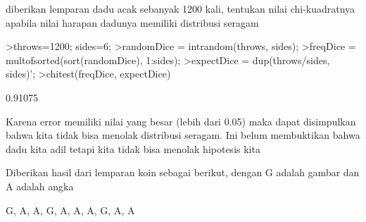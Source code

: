\documentclass[a4paper,10pt]{article}
\begin{document}
\begin{eulernotebook}
\begin{eulercomment}
\begin{eulercomment}
\begin{eulercomment}
\begin{eulercomment}
\begin{eulercomment}
\begin{eulercomment}
\begin{euleroutput}
  [0.34485,  0.080751,  0.87652,  0.75416,  0.68839]
\end{euleroutput}
\begin{eulercomment}
\end{eulercomment}
\begin{eulercomment}
diberikan lemparan dadu acak sebanyak 1200 kali, tentukan nilai
chi-kuadratnya apabila nilai harapan dadunya memiliki distribusi
seragam
\end{eulercomment}
\begin{eulerprompt}
>throws=1200; sides=6;
>randomDice = intrandom(throws, sides);
>freqDice = multofsorted(sort(randomDice), 1:sides);
>expectDice = dup(throws/sides, sides)';
>chitest(freqDice, expectDice)
\end{eulerprompt}
\begin{euleroutput}
  0.91075
\end{euleroutput}
\begin{eulercomment}
Karena error memiliki nilai yang besar (lebih dari 0.05) maka dapat
disimpulkan bahwa kita tidak bisa menolak distribusi seragam. Ini
belum membuktikan bahwa dadu kita adil tetapi kita tidak bisa menolak
hipotesis kita
\end{eulercomment}
\begin{eulercomment}
Diberikan hasil dari lemparan koin sebagai berikut, dengan G adalah
gambar dan A adalah angka

G, A, A, G, A, A, A, G, A, A


\end{eulercomment}
\end{eulercomment}
\end{eulercomment}
\end{eulercomment}
\end{eulercomment}
\end{eulercomment}
\end{eulercomment}
\end{eulernotebook}
\end{document}
